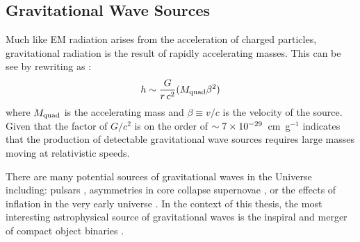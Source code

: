 \subsection{Gravitational Wave Sources}
\label{sec:intro_gw_source}
Much like EM radiation arises from the acceleration of charged particles, gravitational radiation is the result of rapidly accelerating masses. This can be see by rewriting  as \citep{Centrella+10}:
\begin{equation}
\label{eq:intro_quad}
h \apx \frac{G}{r\,c^2} (M_{\rm quad} \beta^2)
\end{equation}
\noindent where $M_{\rm quad}$ is the accelerating mass and $\beta \equiv v / c$ is the velocity of the source. Given that the factor of $G / c^2$ is on the order of $\sim7\times10^{-29}$~cm~g$^{-1}$ indicates that the production of detectable gravitational wave sources requires large masses moving at relativistic speeds.

There are many potential sources of gravitational waves in the Universe \citep[see e.g,][]{CutlerThorne02} including: pulsars \citep{Hewish+68, Jaranowski+98}, asymmetries in core collapse supernovae \citep[SN,][]{Dimmelmeier+01,Ott+06,Ott2009}, or the effects of inflation in the very early universe \citep{Turner1997,Maggiore2000}. In the context of this thesis, the most interesting astrophysical source of gravitational waves is the inspiral and merger of compact object binaries \citep[see e.g.,][]{Belczynski+02,Blanchet2002,Blanchet2006}.

